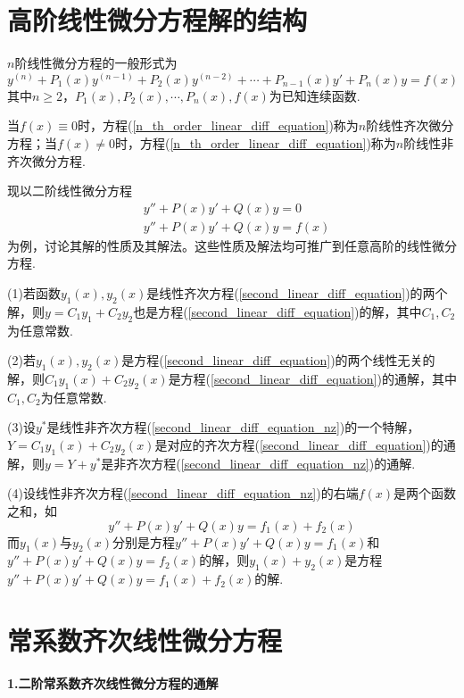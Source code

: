 \section{高阶线性微分方程解的结构}
$n$阶线性微分方程的一般形式为
\begin{equation}
    y^{(n)}+P_1(x)y^{(n-1)}+P_2(x)y^{(n-2)}+\cdots+P_{n-1}(x)y'+P_n(x)y=f(x) \label{n_th_order_linear_diff_equation}
\end{equation}
其中$n\geq2$，$P_1(x),P_2(x),\cdots,P_n(x),f(x)$为已知连续函数.

当$f(x)\equiv0$时，方程(\ref{n_th_order_linear_diff_equation})称为$n$阶线性齐次微分方程；当$f(x)\neq0$时，方程(\ref{n_th_order_linear_diff_equation})称为$n$阶线性非齐次微分方程.

现以二阶线性微分方程
\begin{align}
    & y''+P(x)y'+Q(x)y=0 \label{second_linear_diff_equation} \\
    & y''+P(x)y'+Q(x)y=f(x) \label{second_linear_diff_equation_nz}
\end{align}
为例，讨论其解的性质及其解法。这些性质及解法均可推广到任意高阶的线性微分方程.

(1)若函数$y_1(x),y_2(x)$是线性齐次方程(\ref{second_linear_diff_equation})的两个解，则$y=C_1y_1+C_2y_2$也是方程(\ref{second_linear_diff_equation})的解，其中$C_1,C_2$为任意常数.

(2)若$y_1(x),y_2(x)$是方程(\ref{second_linear_diff_equation})的两个线性无关的解，则$C_1y_1(x)+C_2y_2(x)$是方程(\ref{second_linear_diff_equation})的通解，其中$C_1,C_2$为任意常数.

(3)设$y^*$是线性非齐次方程(\ref{second_linear_diff_equation_nz})的一个特解，$Y=C_1y_1(x)+C_2y_2(x)$是对应的齐次方程(\ref{second_linear_diff_equation})的通解，则$y=Y+y^*$是非齐次方程(\ref{second_linear_diff_equation_nz})的通解.

(4)设线性非齐次方程(\ref{second_linear_diff_equation_nz})的右端$f(x)$是两个函数之和，如
\begin{equation*}
    y''+P(x)y'+Q(x)y=f_1(x)+f_2(x)
\end{equation*}
而$y_1(x)$与$y_2(x)$分别是方程$y''+P(x)y'+Q(x)y=f_1(x)$和$y''+P(x)y'+Q(x)y=f_2(x)$的解，则$y_1(x)+y_2(x)$是方程$y''+P(x)y'+Q(x)y=f_1(x)+f_2(x)$的解.

\section{常系数齐次线性微分方程}
\textbf{1.二阶常系数齐次线性微分方程的通解}

